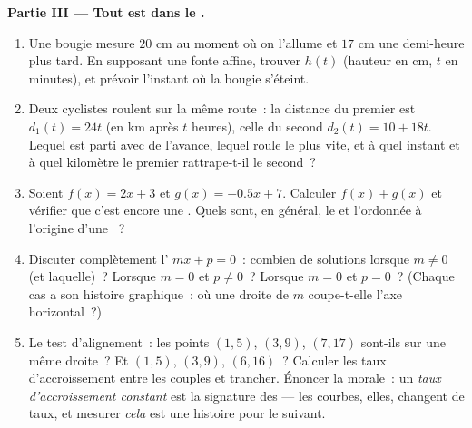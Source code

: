 \begin{problem}
\medskip
\noindent\textbf{Partie III --- Tout est dans le .}
\begin{enumerate}[resume]
  \item Une bougie mesure $20$ cm au moment où on l'allume et
        $17$ cm une demi-heure plus tard. En supposant une fonte
        affine, trouver $h(t)$ (hauteur en cm, $t$ en minutes), et
        prévoir l'instant où la bougie s'éteint.
  \item Deux cyclistes roulent sur la même route~: la distance du
        premier est $d_1(t) = 24t$ (en km après $t$ heures), celle
        du second $d_2(t) = 10 + 18t$. Lequel est parti avec de
        l'avance, lequel roule le plus vite, et à quel instant et à
        quel kilomètre le premier rattrape-t-il le second~?
  \item Soient $f(x) = 2x + 3$ et $g(x) = -0.5x + 7$. Calculer
        $f(x) + g(x)$ et vérifier que c'est encore une . Quels sont, en général, le  et
        l'ordonnée à l'origine d'une ~?
  \item Discuter complètement l' $mx + p = 0$~: combien de
        solutions lorsque $m \neq 0$ (et laquelle)~? Lorsque
        $m = 0$ et $p \neq 0$~? Lorsque $m = 0$ et $p = 0$~? (Chaque
        cas a son histoire graphique~: où une droite de  $m$ coupe-t-elle l'axe horizontal~?)
  \item Le test d'alignement~: les points $(1, 5)$, $(3, 9)$,
        $(7, 17)$ sont-ils sur une même droite~? Et $(1, 5)$,
        $(3, 9)$, $(6, 16)$~? Calculer les taux d'accroissement
        entre les couples et trancher. Énoncer la morale~: un
        \emph{taux d'accroissement constant} est la signature des
         --- les courbes, elles, changent de taux,
        et mesurer \emph{cela} est une histoire pour le 
        suivant.
\end{enumerate}
\end{problem}
